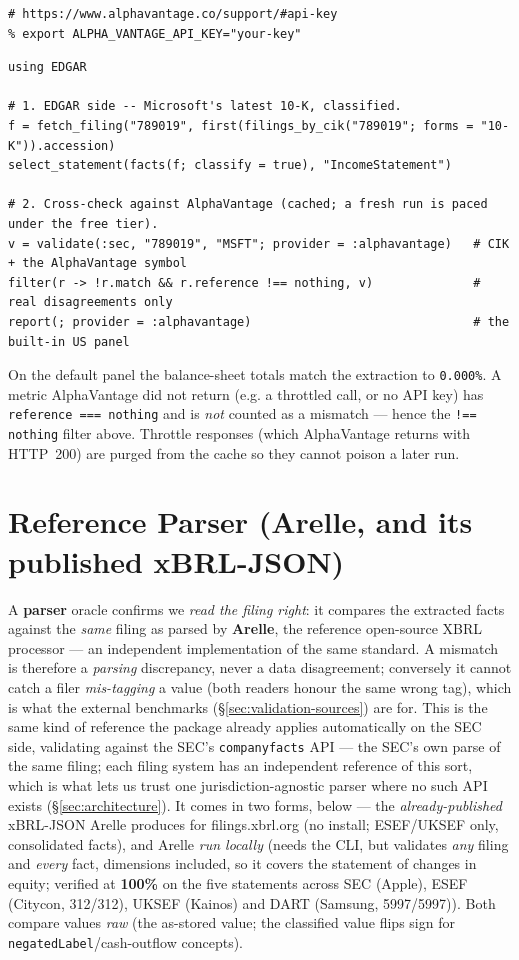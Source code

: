 \documentclass[11pt,a4paper]{report}
\begin{document}
\begin{lstlisting}[style=term]
# https://www.alphavantage.co/support/#api-key
% export ALPHA_VANTAGE_API_KEY="your-key"
\end{lstlisting}

\begin{lstlisting}
using EDGAR

# 1. EDGAR side -- Microsoft's latest 10-K, classified.
f = fetch_filing("789019", first(filings_by_cik("789019"; forms = "10-K")).accession)
select_statement(facts(f; classify = true), "IncomeStatement")

# 2. Cross-check against AlphaVantage (cached; a fresh run is paced under the free tier).
v = validate(:sec, "789019", "MSFT"; provider = :alphavantage)   # CIK + the AlphaVantage symbol
filter(r -> !r.match && r.reference !== nothing, v)              # real disagreements only
report(; provider = :alphavantage)                               # the built-in US panel
\end{lstlisting}

\noindent On the default panel the balance-sheet totals match the extraction to \texttt{0.000\%}.
A metric AlphaVantage did not return (e.g. a throttled call, or no API key) has \texttt{reference ===
nothing} and is \emph{not} counted as a mismatch --- hence the \texttt{!== nothing} filter above.
Throttle responses (which AlphaVantage returns with HTTP~200) are purged from the cache so they cannot
poison a later run.

\section{Reference Parser (Arelle, and its published xBRL-JSON)}
\label{sec:validation-parser}

A \textbf{parser} oracle confirms we \emph{read the filing right}: it compares the extracted facts against
the \emph{same} filing as parsed by \textbf{Arelle}, the reference open-source XBRL processor --- an
independent implementation of the same standard. A mismatch is therefore a \emph{parsing} discrepancy, never
a data disagreement; conversely it cannot catch a filer \emph{mis-tagging} a value (both readers honour the
same wrong tag), which is what the external benchmarks (\S\ref{sec:validation-sources}) are for. This is the same
kind of reference the package already applies automatically on the SEC side, validating against the SEC's
\texttt{companyfacts} API --- the SEC's own parse of the same filing; each filing system has an independent
reference of this sort, which is what lets us trust one jurisdiction-agnostic parser where no such API exists
(\S\ref{sec:architecture}). It comes in two forms, below --- the \emph{already-published} xBRL-JSON Arelle
produces for filings.xbrl.org (no install; ESEF/UKSEF only, consolidated facts), and Arelle \emph{run
locally} (needs the CLI, but validates \emph{any} filing and \emph{every} fact, dimensions included, so it
covers the statement of changes in equity; verified at \textbf{100\%} on the five statements across SEC
(Apple), ESEF (Citycon, 312/312), UKSEF (Kainos) and DART (Samsung, 5997/5997)). Both compare values
\emph{raw} (the as-stored value; the classified value flips sign for \texttt{negatedLabel}/cash-outflow
concepts).
\end{document}
